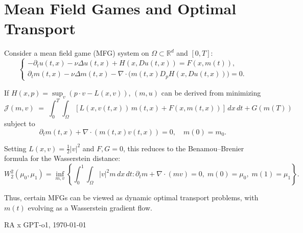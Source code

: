 \documentclass[12pt]{article}
\begin{document}
	
\section*{Mean Field Games and Optimal Transport}

Consider a mean field game (MFG) system on $\Omega \subset \mathbb{R}^d$ and $[0,T]$:
\[
\begin{cases}
-\partial_t u(t,x) - \nu \Delta u(t,x) + H(x,Du(t,x)) = F(x,m(t)), \\[6pt]
\partial_t m(t,x) - \nu \Delta m(t,x) - \nabla \cdot \bigl(m(t,x)D_pH(x,Du(t,x))\bigr) = 0.
\end{cases}
\]

If $H(x,p)=\sup_{v}(p\cdot v - L(x,v))$, $(m,u)$ can be derived from minimizing
\[
\mathcal{J}(m,v) \;=\; \int_0^T \int_{\Omega} [L(x,v(t,x))\,m(t,x) + F(x,m(t,x))]\,dx\,dt + G(m(T))
\]
subject to
\[
\partial_t m(t,x) + \nabla\cdot(m(t,x) v(t,x))=0,\quad m(0)=m_0.
\]

Setting $L(x,v)=\tfrac12|v|^2$ and $F,G=0$, this reduces to the Benamou--Brenier formula for the Wasserstein distance:
\[
W_2^2(\mu_0,\mu_1)=\inf_{m,v}\left\{\int_0^1 \int_{\Omega} |v|^2 m\,dx\,dt : \partial_t m + \nabla\cdot(m v)=0,\; m(0)=\mu_0,\; m(1)=\mu_1\right\}.
\]

Thus, certain MFGs can be viewed as dynamic optimal transport problems, with $m(t)$ evolving as a Wasserstein gradient flow.

\vfill
\hfill
RA x GPT-o1, \today
\end{document}

